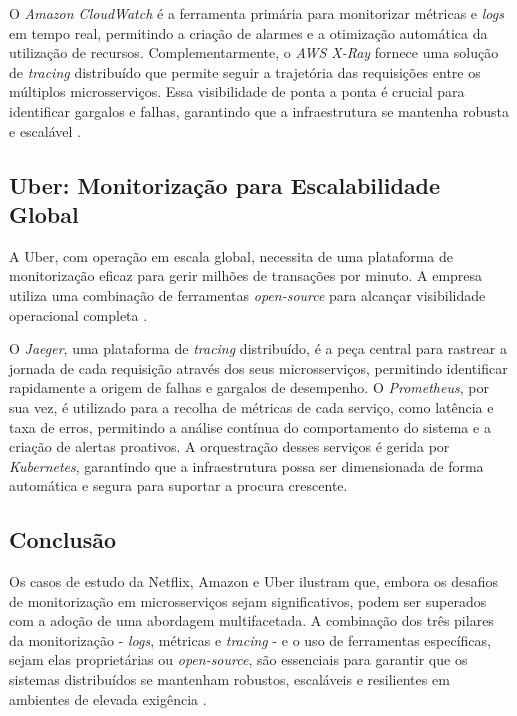 O \textit{Amazon CloudWatch} é a ferramenta primária para monitorizar métricas e \textit{logs} em tempo real, permitindo a criação de alarmes e a otimização automática da utilização de recursos. Complementarmente, o \textit{AWS X-Ray} fornece uma solução de \textit{tracing} distribuído que permite seguir a trajetória das requisições entre os múltiplos microsserviços. Essa visibilidade de ponta a ponta é crucial para identificar gargalos e falhas, garantindo que a infraestrutura se mantenha robusta e escalável \cite{Dragoni2017}.

\subsection{Uber: Monitorização para Escalabilidade Global}

A Uber, com operação em escala global, necessita de uma plataforma de monitorização eficaz para gerir milhões de transações por minuto. A empresa utiliza uma combinação de ferramentas \textit{open-source} para alcançar visibilidade operacional completa \cite{Newman2015}.

O \textit{Jaeger}, uma plataforma de \textit{tracing} distribuído, é a peça central para rastrear a jornada de cada requisição através dos seus microsserviços, permitindo identificar rapidamente a origem de falhas e gargalos de desempenho. O \textit{Prometheus}, por sua vez, é utilizado para a recolha de métricas de cada serviço, como latência e taxa de erros, permitindo a análise contínua do comportamento do sistema e a criação de alertas proativos. A orquestração desses serviços é gerida por \textit{Kubernetes}, garantindo que a infraestrutura possa ser dimensionada de forma automática e segura para suportar a procura crescente.

\subsection{Conclusão}

Os casos de estudo da Netflix, Amazon e Uber ilustram que, embora os desafios de monitorização em microsserviços sejam significativos, podem ser superados com a adoção de uma abordagem multifacetada. A combinação dos três pilares da monitorização - \textit{logs}, métricas e \textit{tracing} - e o uso de ferramentas específicas, sejam elas proprietárias ou \textit{open-source}, são essenciais para garantir que os sistemas distribuídos se mantenham robustos, escaláveis e resilientes em ambientes de elevada exigência \cite{Dragoni2017}.


